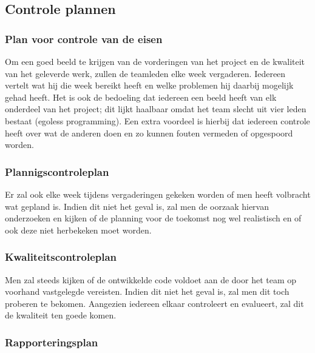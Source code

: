 \documentclass{article}
\begin{document}

\subsection{Controle plannen}


\subsubsection{Plan voor controle van de eisen}

Om een goed beeld te krijgen van de vorderingen van het project en de kwaliteit van het geleverde werk, zullen de teamleden elke week vergaderen. Iedereen vertelt wat hij die week bereikt heeft en welke  problemen hij daarbij mogelijk gehad heeft. Het is ook de bedoeling dat iedereen een beeld heeft van elk onderdeel van het project; dit lijkt haalbaar omdat het team slecht uit vier leden bestaat (egoless programming). Een extra voordeel is hierbij dat iedereen controle heeft over wat de anderen doen en zo kunnen fouten vermeden of opgespoord worden.

\subsubsection{Plannigscontroleplan}

Er zal ook elke week tijdens vergaderingen gekeken worden of men heeft volbracht wat gepland is. Indien dit niet het geval is, zal men de oorzaak hiervan onderzoeken en kijken of de planning voor de toekomst nog wel realistisch en of ook deze niet herbekeken moet worden.

\subsubsection{Kwaliteitscontroleplan}

Men zal steeds kijken of de ontwikkelde code voldoet aan de door het team op voorhand vastgelegde vereisten. Indien dit niet het geval is, zal men dit toch proberen te bekomen.
Aangezien iedereen elkaar controleert en evalueert, zal dit de kwaliteit ten goede komen.

\subsubsection{Rapporteringsplan}
\end{document}
